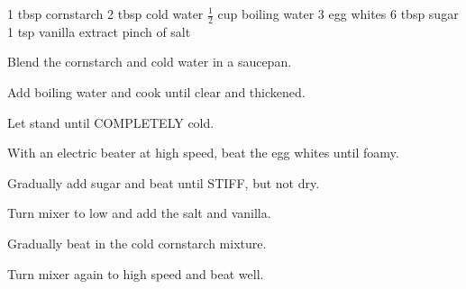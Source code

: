 \dishtype{\dessert}
\dishother{\vegetarian}
\begin{ingreds}
    1 tbsp cornstarch
    2 tbsp cold water
    $\frac{1}{2}$ cup boiling water
    3 egg whites
    6 tbsp sugar
    1 tsp vanilla extract
    pinch of salt
\end{ingreds}
\begin{method}
    Blend the cornstarch and cold water in a saucepan.\par
    Add boiling water and cook until clear and thickened.\par
    Let stand until COMPLETELY cold.\par
    With an electric beater at high speed, beat the egg whites until foamy.\par
    Gradually add sugar and beat until STIFF, but not dry.\par
    Turn mixer to low and add the salt and vanilla.\par
    Gradually beat in the cold cornstarch mixture.\par
    Turn mixer again to high speed and beat well.
\end{method}
